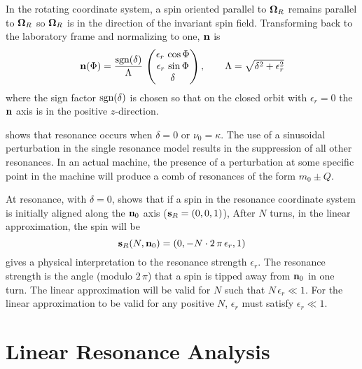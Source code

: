 In the rotating coordinate system, a spin oriented parallel to ${\bf \Omega}_R$ remains parallel to
${\bf \Omega}_R$ so ${\bf \Omega}_R$ is in the direction of the invariant spin field. Transforming back
to the laboratory frame and normalizing to one, ${\bf n}$ is
\begin{equation}
  {\bf n} (\Phi) = \frac{{\text{sgn}}(\delta)}{\Lambda} \, 
  \begin{pmatrix}
    \epsilon_r \, \cos \Phi \\
    \epsilon_r \, \sin \Phi \\
    \delta
  \end{pmatrix},
  \qquad
  \Lambda = \sqrt{\delta^2 + \epsilon_r^2}
  \label{nsdl}
\end{equation}
where the sign factor ${\text{sgn}}(\delta)$ is chosen so that on the closed orbit with $\epsilon_r = 0$
the ${\bf n}$ axis is in the positive $z$-direction.

 shows that resonance occurs when $\delta = 0$ or $\nu_0 = \kappa$.  The use of a
sinusoidal perturbation in the single resonance model results in the suppression of all other
resonances.  In an actual machine, the presence of a perturbation at some specific point in the
machine will produce a comb of resonances of the form $m_0 \pm Q$.

At resonance, with $\delta = 0$,  shows that if a spin in the resonance coordinate system
is initially aligned along the ${\bf n}_0$ axis (${\bf s}_R = (0, 0, 1)$), After $N$ turns, in the linear
approximation, the spin will be
\begin{equation}
  {\bf s}_R(N,{\bf n}_0) = (0, -N \cdot 2 \, \pi \, \epsilon_r, 1)
  \label{sr0n}
\end{equation}
 gives a physical interpretation to the resonance strength $\epsilon_r$. The resonance
strength is the angle (modulo $2 \, \pi$) that a spin is tipped away from ${\bf n}_0$ in one turn. The
linear approximation will be valid for $N$ such that $N \, \epsilon_r \ll 1$. For the linear
approximation to be valid for any positive $N$, $\epsilon_r$ must satisfy $\epsilon_r \ll 1$.

\section{Linear Resonance Analysis}
\label{s:spin.res1}

